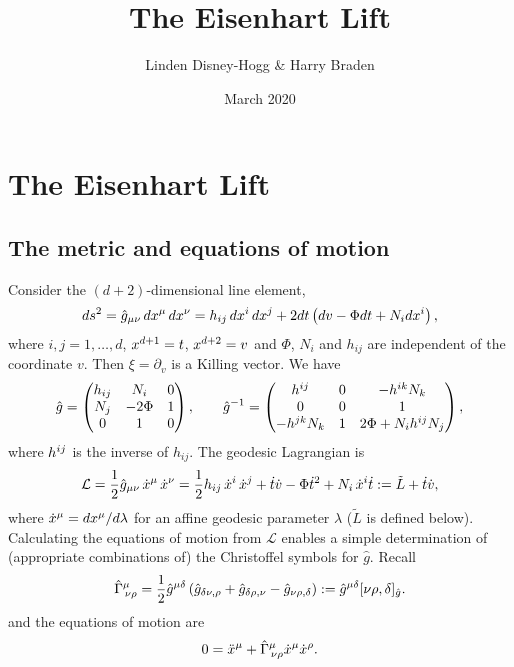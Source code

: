 \documentclass{article}
\title{The Eisenhart Lift}
\author{Linden Disney-Hogg \& Harry Braden}
\date{March 2020}
\begin{document}
\maketitle

\section{The Eisenhart Lift}
\subsection{The metric and equations of motion}
Consider the $(d+2)$-dimensional line element,
\begin{equation}
\label{eislift}
ds^2=\hat g_{\mu\nu}\,dx\sp{\mu}\,dx\sp{\nu}
=h_{ij}\, dx\sp{i}\, dx\sp{j}+2dt \left( dv-\Phi dt+N_i dx\sp{i}\right),
\end{equation}
where $i,j=1,\ldots,d$, $x\sp{d+1}=t$,  $x\sp{d+2}=v$ and $\Phi$, $N_i$ and $h_{ij}$ are independent of the coordinate $v$. Then
$\xi = \partial_v$ is a Killing vector.
We have
$$\hat g=\begin{pmatrix}h_{ij}&N_i&0\\ N_j&-2\Phi&1\\ 0&1&0\end{pmatrix},\qquad
\hat g\sp{-1}=\begin{pmatrix}h\sp{ij}&0&-h\sp{ik}N_k\\ 0&0&1\\ -h\sp{jk}N_k &1&2 \Phi+ N_i h\sp{ij} N_j\end{pmatrix},
$$
where $h\sp{ij}$ is the inverse of $h_{ij}$. The geodesic Lagrangian is
$$\mathcal{ L}=\frac12 \hat  g_{\mu\nu}\,\dot x\sp{\mu}\,\dot x\sp{\nu}=
\frac12 h_{ij}\, \dot x\sp{i}\, \dot x\sp{j}+\dot t \dot v-\Phi {\dot t}^2+N_i \,\dot x\sp{i}\dot t
:= \tilde{L}+\dot t \dot v  ,
$$
where $\dot x\sp{\mu}=dx\sp{\mu}/d\lambda$ for an affine geodesic parameter $\lambda$ ($\tilde{L}$ is defined below).
Calculating the equations of motion from $\mathcal{L}$ enables a simple determination of (appropriate
combinations of) the  Christoffel symbols for $\hat g$. Recall
$$\hat \Gamma\sp{\mu}_{\, \nu \rho}=\frac12 \hat g\sp{\mu \delta}\left(
\hat g_{\delta \nu, \rho} + \hat g_{\delta \rho, \nu} - \hat g_{ \nu \rho,\delta}\right)
:=  \hat g\sp{\mu \delta}[ \nu \rho,\delta]_{\hat g}.
$$
and the equations of motion are
$$ 0=\ddot x\sp{\mu}+ \hat \Gamma\sp{\mu}_{\, \nu \rho} \dot x\sp{\mu}\dot x\sp{\rho}.
$$
\end{document}
